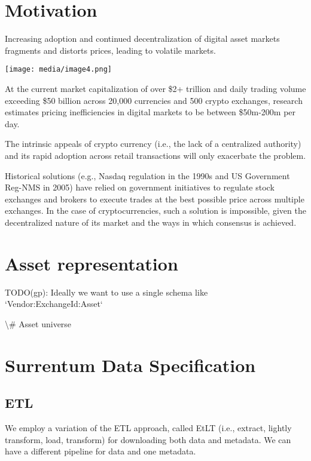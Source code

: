 \documentclass[11pt, reqno]{amsart}
\begin{document}
\section{Motivation}

Increasing adoption and continued decentralization of digital asset
markets fragments and distorts prices, leading to volatile markets.

\texttt{[image: media/image4.png]}

At the current market capitalization of over \$2+ trillion and daily
trading volume exceeding \$50 billion across 20,000 currencies and 500
crypto exchanges, research estimates pricing inefficiencies in digital
markets to be between \$50m-200m per day.

The intrinsic appeals of crypto currency (i.e., the lack of a
centralized authority) and its rapid adoption across retail transactions
will only exacerbate the problem.

Historical solutions (e.g., Nasdaq regulation in the 1990s and US
Government Reg-NMS in 2005) have relied on government initiatives to
regulate stock exchanges and brokers to execute trades at the best
possible price across multiple exchanges. In the case of
cryptocurrencies, such a solution is impossible, given the decentralized
nature of its market and the ways in which consensus is achieved.

\section{Asset representation}

TODO(gp): Ideally we want to use a single schema like
`Vendor:ExchangeId:Asset`

\textbackslash\# Asset universe

\section{Surrentum Data Specification}

\subsection{ETL}

We employ a variation of the ETL approach, called EtLT (i.e., extract,
lightly transform, load, transform) for downloading both data and
metadata. We can have a different pipeline for data and one metadata.
\end{document}
